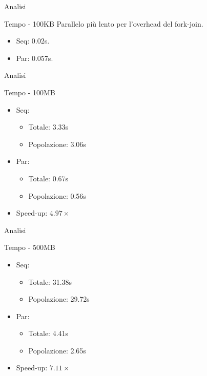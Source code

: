\begin{frame}{Analisi}
    \begin{block}{Tempo - 100KB}
        Parallelo più lento per l'overhead del fork-join.
        \begin{itemize}
            \item Seq: 0.02s.
            \item Par: 0.057s.
        \end{itemize}
    \end{block}
\end{frame}

\begin{frame}{Analisi}
    \begin{block}{Tempo - 100MB}
        \begin{itemize}
            \item Seq:
            \begin{itemize}
                \item Totale: 3.33s
                \item Popolazione: 3.06s
            \end{itemize}
            \item Par:
            \begin{itemize}
                \item Totale: 0.67s
                \item Popolazione: 0.56s
            \end{itemize}
            \item Speed-up: $4.97\times$
        \end{itemize}
    \end{block}
\end{frame}

\begin{frame}{Analisi}
    \begin{block}{Tempo - 500MB}
        \begin{itemize}
            \item Seq:
            \begin{itemize}
                \item Totale: 31.38s
                \item Popolazione: 29.72s
            \end{itemize}
            \item Par:
            \begin{itemize}
                \item Totale: 4.41s
                \item Popolazione: 2.65s
            \end{itemize}
            \item Speed-up: $7.11\times$
        \end{itemize}
    \end{block}
\end{frame}


